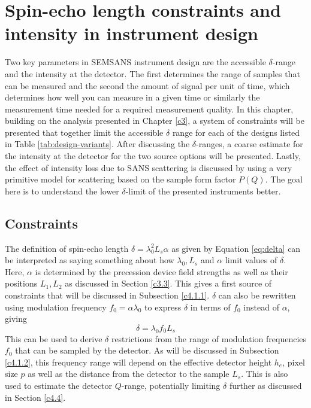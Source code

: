 \chapter{Spin-echo length constraints and intensity in instrument design}
\label{chapter:constraints}
\label{c4:constraints}
Two key parameters in SEMSANS instrument design are the accessible $\delta$-range and the intensity at the detector. The first determines the range of samples that can be measured and the second the amount of signal per unit of time, which determines how well you can measure in a given time or similarly the measurement time needed for a required measurement quality. In this chapter, building on the analysis presented in Chapter \ref{c3}, a system of constraints will be presented that together limit the accessible $\delta$ range for each of the designs listed in Table \ref{tab:design-variants}. After discussing the $\delta$-ranges, a coarse estimate for the intensity at the detector for the two source options will be presented. Lastly, the effect of intensity loss due to SANS scattering is discussed by using a very primitive model for scattering based on the sample form factor $P(Q)$. The goal here is to understand the lower $\delta$-limit of the presented instruments better.
\section{Constraints}
\label{c4.1}
The definition of spin-echo length $\delta  = \lambda_0^2L_s\alpha$ as given by Equation \eqref{eq:delta} can be interpreted as saying something about how $\lambda_0, L_s$ and $\alpha$ limit values of $\delta$. Here, $\alpha$ is determined by the precession device field strengths as well as their positions $L_1, L_2$ as discussed in Section \ref{c3.3}. This gives a first source of constraints that will be discussed in Subsection \ref{c4.1.1}. $\delta$ can also be rewritten using modulation frequency $f_0 = \alpha\lambda_0$ to express $\delta$ in terms of $f_0$ instead of $\alpha$, giving
\begin{equation}
	\delta =\lambda_0 f_0L_s \label{eq:delta-f}
\end{equation}
This can be used to derive $\delta$ restrictions from the range of modulation frequencies $f_0$ that can be sampled by the detector. As will be discussed in Subsection \ref{c4.1.2}, this frequency range will depend on the effective detector height $h_e$, pixel size $p$ as well as the distance from the detector to the sample $L_s$. This is also used to estimate the detector $Q$-range, potentially limiting $\delta$ further as discussed in Section \ref{c4.4}.

